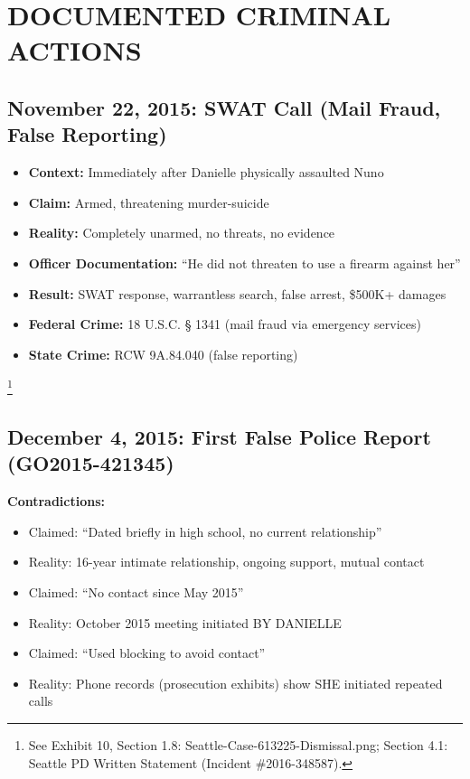 \documentclass[12pt,oneside]{article}
\begin{document}
\section*{DOCUMENTED CRIMINAL ACTIONS}

\subsection*{November 22, 2015: SWAT Call (Mail Fraud, False Reporting)}

\begin{itemize}

\item \textbf{Context:} Immediately after Danielle physically assaulted Nuno

\item \textbf{Claim:} Armed, threatening murder-suicide

\item \textbf{Reality:} Completely unarmed, no threats, no evidence

\item \textbf{Officer Documentation:} ``He did not threaten to use a firearm against her''

\item \textbf{Result:} SWAT response, warrantless search, false arrest, \$500K+ damages

\item \textbf{Federal Crime:} 18 U.S.C. § 1341 (mail fraud via emergency services)

\item \textbf{State Crime:} RCW 9A.84.040 (false reporting)

\end{itemize}

\footnote{See Exhibit 10, Section 1.8: Seattle-Case-613225-Dismissal.png; Section 4.1: Seattle PD Written Statement (Incident \#2016-348587).}

\subsection*{December 4, 2015: First False Police Report (GO2015-421345)}

\textbf{Contradictions:}

\begin{itemize}

\item Claimed: ``Dated briefly in high school, no current relationship''

\item Reality: 16-year intimate relationship, ongoing support, mutual contact

\item Claimed: ``No contact since May 2015''

\item Reality: October 2015 meeting initiated BY DANIELLE

\item Claimed: ``Used blocking to avoid contact''

\item Reality: Phone records (prosecution exhibits) show SHE initiated repeated calls

\end{itemize}
\end{document}
